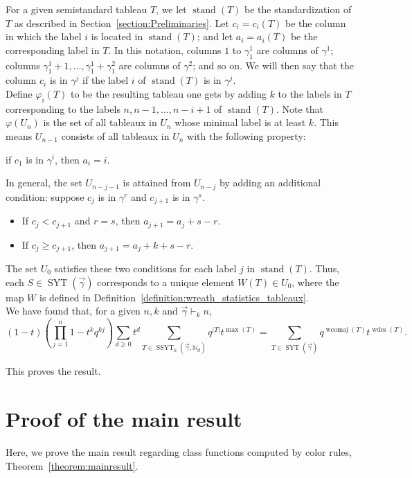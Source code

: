 \documentclass[a4paper,12pt]{amsart}
\theoremstyle{plain}
\theoremstyle{definition}
\theoremstyle{remark}
\DeclareMathOperator{\SSYT}{SSYT}
\DeclareMathOperator{\stand}{stand}
\DeclareMathOperator{\SYT}{SYT}
\DeclareMathOperator{\wcomaj}{wcomaj}
\DeclareMathOperator{\wdes}{wdes}
\begin{document}
For a given semistandard tableau $T$, we let $\stand(T)$ be the standardization of $T$ as described in Section~\ref{section:Preliminaries}.
Let $c_i=c_i(T)$ be the column in which the label $i$ is located in $\stand(T)$; and let $a_i = a_i(T)$ be the corresponding label in $T$.
In this notation, columns $1$ to $\gamma^1_1$ are columns of $\gamma^1$; columns $\gamma^1_1+1,\dots, \gamma^1_1+\gamma^2_1$ are columns of $\gamma^2$; and so on. We will then say that the column $c_i$ is in $\gamma^j$ if the label $i$ of $\stand(T)$ is in $\gamma^j$.
\\

Define $\varphi_i(T)$ to be the resulting tableau one gets by adding $k$ to the labels in $T$ corresponding to the labels $n,n-1,\dots, n-i+1$ of $\stand(T)$. 
Note that $\varphi(U_n)$ is the set of all tableaux in $U_n$ whose minimal label is at least $k$. This means
$U_{n-1}$ consists of all  tableaux in $U_n$ with the following property:
\begin{center}
if $c_1$ is in $\gamma^i$, then $a_i = i$. 
\end{center}
In general, the set $U_{n-j-1}$ is attained from $U_{n-j}$ by adding an additional condition: suppose $c_j$ is in $\gamma^{r}$ and $c_{j+1}$ is in $\gamma^{s}$.
\begin{itemize}
    \item If $c_j<c_{j+1}$ and $r=s$, then $a_{j+1} = a_j+{s-r}.$
    \item If $c_j \geq c_{j+1}$, then $a_{j+1} = a_j + k + s - r $.
\end{itemize}
The set $U_0$ satisfies these two conditions for each label $j$ in $\stand(T)$. Thus, each $S \in \SYT(\vec{\gamma})$ corresponds to a unique element $W(T) \in U_0$, where the map $W$ is defined in Definition~\ref{definition:wreath_statistics_tableaux}.
\\

We have found that, for a given $n,k$ and $\vec{\gamma} \vdash_k n$, 
\[
(1-t)\left(\prod_{j=1}^n 1-t^k q^{kj} \right) \sum_{d \geq 0} t^d \sum_{T \in \SSYT_{k}(\vec{\gamma},\mathbb{N}_d)} q^{|T|} t^{\max(T)}
=
\sum_{T \in \SYT(\vec{\gamma})} q^{\wcomaj(T)} t^{\wdes(T)}.
\]

This proves the result.

\section{Proof of the main result}\label{section:main_proof}
Here, we prove the main result regarding class functions computed by color rules, Theorem~\ref{theorem:mainresult}.
\end{document}
